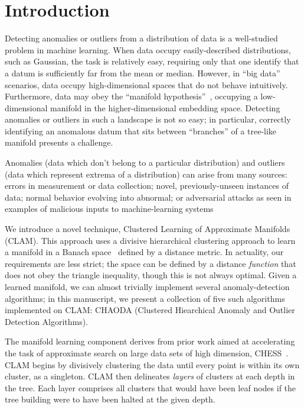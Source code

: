 \section{Introduction}
\label{sec:introduction}

Detecting anomalies or outliers from a distribution of data is a well-studied problem in machine learning. When data occupy easily-described distributions, such as Gaussian, the task is relatively easy, requiring only that one identify that a datum is sufficiently far from the mean or median. However, in ``big data'' scenarios, data occupy high-dimensional spaces that do not behave intuitively. Furthermore, data may obey the ``manifold hypothesis''~\cite{fefferman2016testing}, occupying a low-dimensional manifold in the higher-dimensional embedding space. Detecting anomalies or outliers in such a landscape is not so easy; in particular, correctly identifying an anomalous datum that sits between ``branches'' of a tree-like manifold presents a challenge.

Anomalies (data which don't belong to a particular distribution) and outliers (data which represent extrema of a distribution) can arise from many sources: errors in measurement or data collection; novel, previously-unseen instances of data; normal behavior evolving into abnormal; or adversarial attacks as seen in examples of malicious inputs to machine-learning systems~\cite{schoolbus-ostrich}




We introduce a novel technique, Clustered Learning of Approximate Manifolds (CLAM). This
approach uses a divisive hierarchical clustering approach to learn a manifold in a
Banach space~\cite{} defined by a distance metric. In actuality, our requirements are
less strict; the space can be defined by a distance \textit{function} that does not obey
the triangle inequality, though this is not always optimal. Given a learned manifold, we
can almost trivially implement several anomaly-detection algorithms; in this manuscript,
we present a collection of five such algorithms implemented on CLAM: CHAODA (Clustered Hiearchical Anomaly and Outlier Detection Algorithms).


The manifold learning component derives from prior work aimed at accelerating the task of approximate search on large data sets of high dimension, CHESS~\cite{ishaq2019entropy}. CLAM begins by divisively clustering the data until every point is within its own cluster, as a singleton.
CLAM then delineates \textit{layers} of clusters at each depth in the tree.
Each layer comprises all clusters that would have been leaf nodes if the tree building were to have been halted at the given depth.


